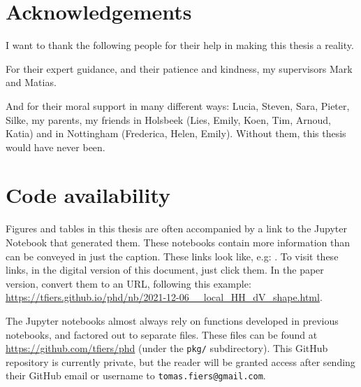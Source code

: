 

\chapter*{Acknowledgements}

I want to thank the following people for their help in making this thesis a reality.

For their expert guidance, and their patience and kindness, my supervisors Mark and Matias.

And for their moral support in many different ways:
Lucia, Steven, Sara, Pieter, Silke, my parents, my friends in Holsbeek (Lies, Emily, Koen, Tim, Arnoud, Katia) and in Nottingham (Frederica, Helen, Emily).
Without them, this thesis would have never been.


\chapter*{Code availability}

Figures and tables in this thesis are often accompanied by a link to the Jupyter Notebook that generated them. These notebooks contain more information than can be conveyed in just the caption. These links look like, e.g:
.
To visit these links, in the digital version of this document, just click them. In the paper version, convert them to an URL, following this example: {\small \url{https://tfiers.github.io/phd/nb/2021-12-06__local_HH_dV_shape.html}}.

The Jupyter notebooks almost always rely on functions developed in previous notebooks, and factored out to separate files. These files can be found at \url{https://github.com/tfiers/phd} (under the \texttt{pkg/} subdirectory). This GitHub repository is currently private, but the reader will be granted access after sending their GitHub email or username to \texttt{tomas.fiers@gmail.com}.
